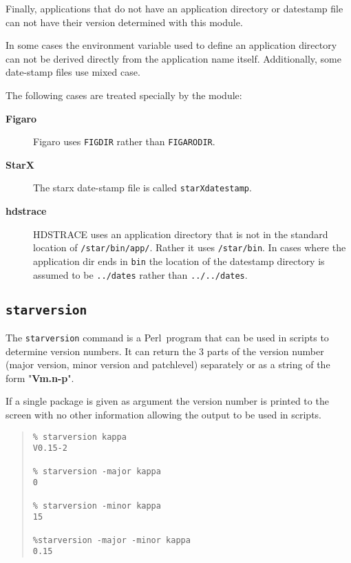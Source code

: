 \documentclass[twoside,11pt]{article}
\newenvironment{myquote}{\begin{quote}\begin{small}}{\end{small}\end{quote}}
\newcommand{\perl}{\xref{\textsf{Perl}}{sun193}{}}
\newcommand{\xref}[3]{#1}
\renewcommand{\_}{\texttt{\symbol{95}}}
\begin{document}
Finally, applications that do not have an application directory
or datestamp file can not have their version determined with this module.

In some cases the environment variable used to define an application
directory can not be derived directly from the application name
itself. Additionally, some date-stamp files use mixed case.

The following cases are treated specially by the module:

\begin{description}
\item[\textbf{Figaro}] \mbox{}

Figaro uses \texttt{FIG\_DIR} rather than \texttt{FIGARO\_DIR}.

\item[\textbf{StarX}] \mbox{}

The starx date-stamp file is called \texttt{starX\_datestamp}.

\item[\textbf{hdstrace}] \mbox{}

HDSTRACE uses an application directory that is not in the
standard location of \texttt{/star/bin/app/}. Rather it uses
\texttt{/star/bin}. In cases where the application dir ends in
\texttt{bin} the location of the datestamp directory is assumed
to be \texttt{../dates} rather than \texttt{../../dates}.

\end{description}

\subsection{\texttt{starversion}}

The \texttt{starversion} command is a \perl\ program that can be used in scripts
to determine version numbers.  It can return the 3 parts of the version number
(major version, minor version and patchlevel) separately or as a string of the
form "\textbf{Vm.n-p}".

If a single package is given as argument the version number is printed to the
screen with no other information allowing the output to be used in scripts.


\begin{myquote}
\begin{verbatim}
% starversion kappa
V0.15-2

% starversion -major kappa
0

% starversion -minor kappa
15

%starversion -major -minor kappa
0.15
\end{verbatim}
\end{myquote}
\end{document}
